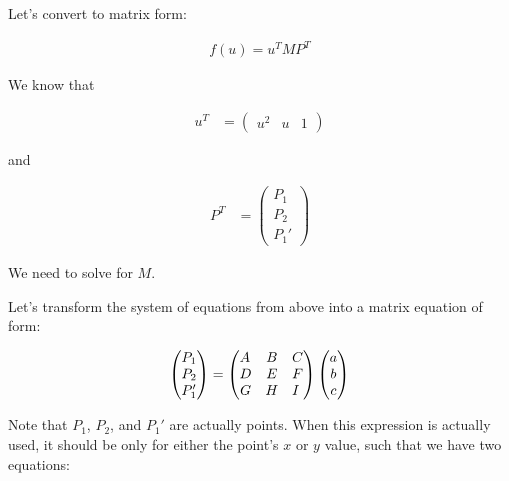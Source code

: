 \documentclass[12pt]{article}
\begin{document}
Let's convert to matrix form:

\begin{align}
f(u) = u^{T}MP^{T}
\end{align}

We know that

\begin{align}
u^T &=
\begin{pmatrix}
u^2 & u & 1
\end{pmatrix} \nonumber
\end{align}

and

\begin{align}
P^T &=
\begin{pmatrix}
P_1 \\
P_2 \\
P_1'
\end{pmatrix} \nonumber
\end{align}

We need to solve for $M$.

Let's transform the system of equations from above into a matrix equation of form:

\begin{align}
\begin{pmatrix}
P_1 \\
P_2 \\
P_1'
\end{pmatrix} \nonumber
&=
\begin{pmatrix}
A \hfill & B & C \\
D & E & F \hfill \\
G & H & I \hfill 
\end{pmatrix} \nonumber
\begin{pmatrix}
a \\
b \\
c
\end{pmatrix} \nonumber \\
\end{align}

Note that $P_1$, $P_2$, and $P_1'$ are actually points. 
When this expression is actually used, 
it should be only for either the point's $x$ or $y$ value, 
such that we have two equations:
\end{document}
